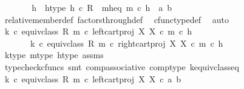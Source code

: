\begin{isabellebody}
\ \ \ \ \isamarkupfalse%
\ \isamarkupfalse%
\ h\ \ h{\isacharunderscore}{\kern0pt}type{\isacharcolon}{\kern0pt}\ {\isachardoublequoteopen}h\ {\isasymin}\isactrlsub c\ R{\isachardoublequoteclose}\ \ m{\isacharunderscore}{\kern0pt}h{\isacharunderscore}{\kern0pt}eq{\isacharcolon}{\kern0pt}\ {\isachardoublequoteopen}m\ {\isasymcirc}\isactrlsub c\ h\ {\isacharequal}{\kern0pt}\ {\isasymlangle}a{\isacharcomma}{\kern0pt}\ b{\isasymrangle}{\isachardoublequoteclose}\isanewline
\ \ \ \ \ \ \isamarkupfalse%
\ relative{\isacharunderscore}{\kern0pt}member{\isacharunderscore}{\kern0pt}def\ factors{\isacharunderscore}{\kern0pt}through{\isacharunderscore}{\kern0pt}def\ \isamarkupfalse%
\ cfunc{\isacharunderscore}{\kern0pt}type{\isacharunderscore}{\kern0pt}def\ \isamarkupfalse%
\ auto\ \isanewline
\isanewline
\ \ \ \ \isamarkupfalse%
\ {\isachardoublequoteopen}{\isacharparenleft}{\kern0pt}k\ {\isasymcirc}\isactrlsub c\ equiv{\isacharunderscore}{\kern0pt}class\ {\isacharparenleft}{\kern0pt}R{\isacharcomma}{\kern0pt}\ m{\isacharparenright}{\kern0pt}{\isacharparenright}{\kern0pt}\ {\isasymcirc}\isactrlsub c\ left{\isacharunderscore}{\kern0pt}cart{\isacharunderscore}{\kern0pt}proj\ X\ X\ {\isasymcirc}\isactrlsub c\ m\ {\isasymcirc}\isactrlsub c\ h\ {\isacharequal}{\kern0pt}\isanewline
\ \ \ \ \ \ \ {\isacharparenleft}{\kern0pt}k\ {\isasymcirc}\isactrlsub c\ equiv{\isacharunderscore}{\kern0pt}class\ {\isacharparenleft}{\kern0pt}R{\isacharcomma}{\kern0pt}\ m{\isacharparenright}{\kern0pt}{\isacharparenright}{\kern0pt}\ {\isasymcirc}\isactrlsub c\ right{\isacharunderscore}{\kern0pt}cart{\isacharunderscore}{\kern0pt}proj\ X\ X\ {\isasymcirc}\isactrlsub c\ m\ {\isasymcirc}\isactrlsub c\ h{\isachardoublequoteclose}\isanewline
\ \ \ \ \ \ \isamarkupfalse%
\ k{\isacharunderscore}{\kern0pt}type\ m{\isacharunderscore}{\kern0pt}type\ h{\isacharunderscore}{\kern0pt}type\ assms\ \isanewline
\ \ \ \ \ \ \isamarkupfalse%
\ {\isacharparenleft}{\kern0pt}typecheck{\isacharunderscore}{\kern0pt}cfuncs{\isacharcomma}{\kern0pt}\ smt\ comp{\isacharunderscore}{\kern0pt}associative{}\ comp{\isacharunderscore}{\kern0pt}type\ k{\isacharunderscore}{\kern0pt}equiv{\isacharunderscore}{\kern0pt}class{\isacharunderscore}{\kern0pt}eq{\isacharparenright}{\kern0pt}\isanewline
\ \ \ \ \isamarkupfalse%
\ \isamarkupfalse%
\ {\isachardoublequoteopen}{\isacharparenleft}{\kern0pt}k\ {\isasymcirc}\isactrlsub c\ equiv{\isacharunderscore}{\kern0pt}class\ {\isacharparenleft}{\kern0pt}R{\isacharcomma}{\kern0pt}\ m{\isacharparenright}{\kern0pt}{\isacharparenright}{\kern0pt}\ {\isasymcirc}\isactrlsub c\ left{\isacharunderscore}{\kern0pt}cart{\isacharunderscore}{\kern0pt}proj\ X\ X\ {\isasymcirc}\isactrlsub c\ {\isasymlangle}a{\isacharcomma}{\kern0pt}\ b{\isasymrangle}\ {\isacharequal}{\kern0pt}\isanewline

\end{isabellebody}
